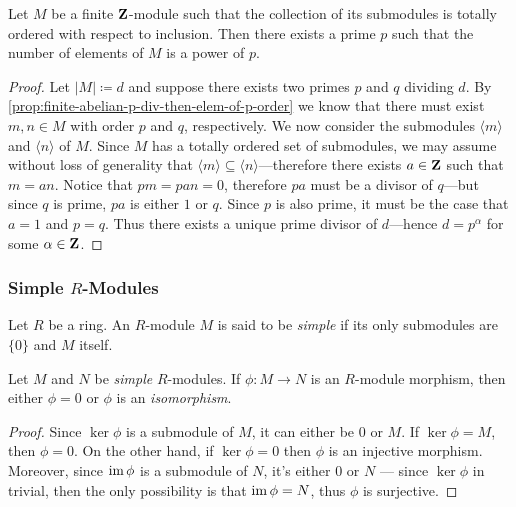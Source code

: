 \begin{example}
\label{exp:totally-ordered-submodules-prime-division}
Let \(M\) be a finite \(\mathbf{Z}\)-module such that the collection of its submodules
is totally ordered with respect to inclusion. Then there exists a prime \(p\)
such that the number of elements of \(M\) is a power of \(p\).

\begin{proof}
Let \(|M| \coloneq d\) and suppose there exists two primes \(p\) and \(q\)
dividing \(d\). By \cref{prop:finite-abelian-p-div-then-elem-of-p-order} we know
that there must exist \(m, n \in M\) with order \(p\) and \(q\),
respectively. We now consider the submodules \(\langle m \rangle\) and
\(\langle n \rangle\) of \(M\). Since \(M\) has a totally ordered set of
submodules, we may assume without loss of generality that
\(\langle m \rangle \subseteq \langle n \rangle\)---therefore there exists \(a
\in \mathbf{Z}\) such that \(m = a n\). Notice that \(p m = p a n = 0\), therefore \(p
a\) must be a divisor of \(q\)---but since \(q\) is prime, \(p a\) is either
\(1\) or \(q\). Since \(p\) is also prime, it must be the case that \(a = 1\)
and \(p = q\). Thus there exists a unique prime divisor of \(d\)---hence \(d =
p^{\alpha}\) for some \(\alpha \in \mathbf{Z}\).
\end{proof}
\end{example}

\subsubsection{Simple \texorpdfstring{\(R\)}{R}-Modules}

\begin{definition}
\label{def:simple-module}
Let \(R\) be a ring. An \(R\)-module \(M\) is said to be \emph{simple} if its
only submodules are \(\{0\}\) and \(M\) itself.
\end{definition}

\begin{lemma}[Schur's]
\label{lem:schur-lemma}
Let \(M\) and \(N\) be \emph{simple} \(R\)-modules. If \(\phi: M \to N\) is an
\(R\)-module morphism, then either \(\phi = 0\) or \(\phi\) is an
\emph{isomorphism}.
\end{lemma}

\begin{proof}
Since \(\ker \phi\) is a submodule of \(M\), it can either be \(0\) or \(M\). If
\(\ker \phi = M\), then \(\phi = 0\). On the other hand, if \(\ker \phi = 0\)
then \(\phi\) is an injective morphism. Moreover, since \(\operatorname{im} \phi\) is a
submodule of \(N\), it's either \(0\) or \(N\) --- since \(\ker \phi\) in
trivial, then the only possibility is that \(\operatorname{im} \phi = N\), thus \(\phi\) is
surjective.
\end{proof}

